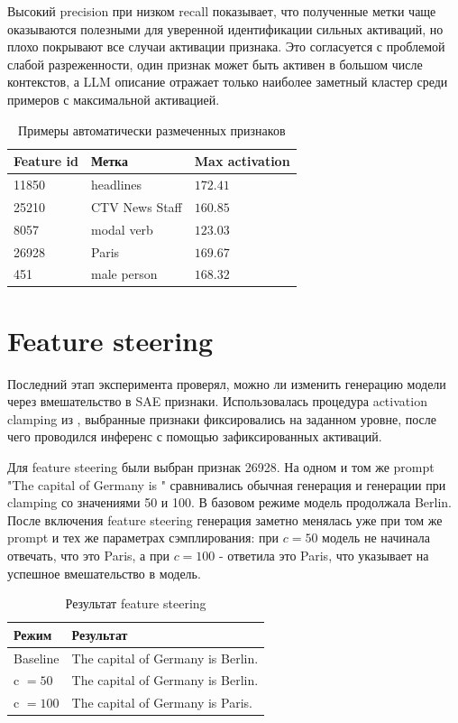 \documentclass[a4paper,14pt]{extreport}
\begin{document}
Высокий precision при низком recall показывает, что полученные метки чаще
оказываются полезными для уверенной идентификации сильных активаций, но плохо
покрывают все случаи активации признака. Это согласуется с проблемой слабой
разреженности, один признак может быть активен в большом числе контекстов, а
LLM описание отражает только наиболее заметный кластер среди
примеров с максимальной активацией.

\begin{table}[H]
    \centering
    \small
    \caption{Примеры автоматически размеченных признаков}
    \label{tab:feature_label_examples}
    \begin{tabular}{p{}p{}p{}}
        \toprule
        Feature id & Метка & Max activation \\
        \midrule
        11850 & headlines & $172.41$ \\
        25210 & CTV News Staff & $160.85$ \\
        8057 & modal verb & $123.03$ \\
        26928 & Paris & $169.67$ \\
        451 & male person & $168.32$ \\
        \bottomrule
    \end{tabular}
\end{table}


\section{Feature steering}

Последний этап эксперимента проверял, можно ли изменить генерацию модели через
вмешательство в SAE признаки. Использовалась процедура activation
clamping из \cite{templeton2024scaling}, выбранные признаки фиксировались на заданном уровне, после чего
проводился инференс с помощью зафиксированных активаций.

Для feature steering были выбран признак 26928. На одном и том же prompt
"The capital of Germany is " сравнивались обычная генерация и
генерации при clamping со значениями 50 и 100. В базовом режиме модель продолжала
Berlin. После включения feature steering
генерация заметно менялась уже при том же prompt и тех же параметрах сэмплирования:
при $c=50$ модель не начинала отвечать, что это Paris, а при $c=100$ - ответила это Paris, 
что указывает на успешное вмешательство в модель.

\begin{table}[H]
    \centering
    \small
    \caption{Результат feature steering}
    \label{tab:steering_result}
    \begin{tabular}{p{}p{}}
        \toprule
        Режим & Результат \\
        \midrule
        Baseline & The capital of Germany is Berlin. \\
        c $=50$ & The capital of Germany is Berlin. \\
        c $=100$ & The capital of Germany is Paris. \\
        \bottomrule
    \end{tabular}
\end{table}
\end{document}
